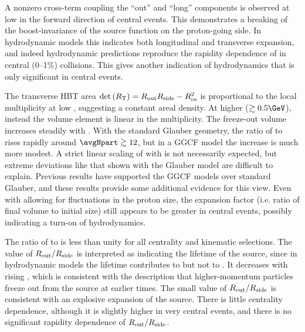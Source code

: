 A nonzero cross-term \Rol coupling the ``out'' and ``long'' components is observed at low \kt in the forward direction of central events.
This demonstrates a breaking of the boost-invariance of the source function on the proton-going side.
In hydrodynamic models this indicates both longitudinal and transverse expansion, and indeed hydrodynamic predictions reproduce the rapidity dependence of \Rol in central (0--1\%) collisions.
This gives another indication of hydrodynamics that is only significant in central events.

The transverse HBT area $\mathrm{det}\left(R_\mathrm{T}\right) = R_{\mathrm{out}} R_{\mathrm{side}} - R_{\mathrm{os}}^2$ is proportional to the local multiplicity \dNdy at low \kt, suggesting a constant areal density.
At higher \kt ($\gtrsim 0.5 \GeV$), instead the volume element \detR is linear in the multiplicity.
The freeze-out volume increases steadily with \avgNpart.
With the standard Glauber geometry, the ratio of \detR to \Npart rises rapidly around $\avgNpart \gtrsim 12$, but in a \ac{GGCF} model the increase is much more modest.
A strict linear scaling of \detR with \avgNpart is not necessarily expected, but extreme deviations like that shown with the Glauber model are difficult to explain.
Previous results have supported the \ac{GGCF} models over standard Glauber, and these results provide some additional evidence for this view.
Even with allowing for fluctuations in the proton size, the expansion factor (i.e. ratio of final volume to initial size) still appears to be greater in central events, possibly indicating a turn-on of hydrodynamics.

The ratio of \Rout to \Rside is less than unity for all centrality and kinematic selections.
The value of $R_{\mathrm{out}}/R_{\mathrm{side}}$ is interpreted as indicating the lifetime of the source, since in hydrodynamic models the lifetime contributes to \Rout but not to \Rside.
It decreases with rising \kt, which is consistent with the description that higher-momentum particles freeze out from the source at earlier times.
The small value of $R_{\mathrm{out}}/R_{\mathrm{side}}$ is consistent with an explosive expansion of the source.
There is little centrality dependence, although it is slightly higher in very central events, and there is no significant rapidity dependence of $R_{\mathrm{out}}/R_{\mathrm{side}}$.

